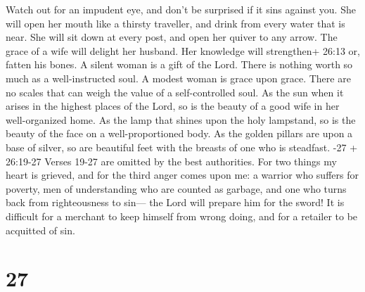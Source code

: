 Watch out for an impudent eye, and don't be surprised if it sins against
you.  She will open her mouth like a thirsty traveller, and
drink from every water that is near. She will sit down at every post,
and open her quiver to any arrow.  The grace of a wife will
delight her husband. Her knowledge will strengthen+ 26:13 or, fatten his
bones.  A silent woman is a gift of the Lord. There is
nothing worth so much as a well-instructed soul.  A modest
woman is grace upon grace. There are no scales that can weigh the value
of a self-controlled soul.  As the sun when it arises in
the highest places of the Lord, so is the beauty of a good wife in her
well-organized home.  As the lamp that shines upon the holy
lampstand, so is the beauty of the face on a well-proportioned body.
 As the golden pillars are upon a base of silver, so are
beautiful feet with the breasts of one who is steadfast.
-27 + 26:19-27 Verses 19-27 are omitted by the best
authorities.  For two things my heart is grieved, and for
the third anger comes upon me: a warrior who suffers for poverty, men of
understanding who are counted as garbage, and one who turns back from
righteousness to sin--- the Lord will prepare him for the sword!
 It is difficult for a merchant to keep himself from wrong
doing, and for a retailer to be acquitted of sin.

\hypertarget{section-7}{%
\section{27}\label{section-7}}

